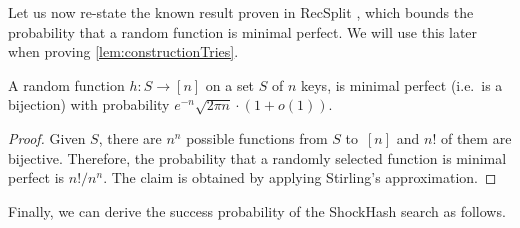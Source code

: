 \documentclass[a4paper,USenglish,cleveref]{lipics-v2021}
\begin{document}
Let us now re-state the known result proven in RecSplit \cite{esposito2020recsplit}, which bounds the probability that a random function is minimal perfect.
We will use this later when proving \cref{lem:constructionTries}.

\begin{lemma}
  \label{lem:bruteForce}
  A random function $h: S \rightarrow [n]$ on a set $S$ of $n$ keys, is minimal perfect
  (i.e.\ is a bijection)
  with probability $e^{-n}\sqrt{2 \pi n}\cdot (1+o(1))$.
\end{lemma}
\begin{proof}
  Given $S$, there are $n^n$ possible functions from $S$ to~$[n]$ and $n!$ of them are bijective.
  Therefore, the probability that a randomly selected function is minimal perfect is $n!/n^n$.
  The claim is obtained by applying Stirling's approximation.
  \hfill
\end{proof}

Finally, we can derive the success probability of the ShockHash search as follows.
\end{document}
